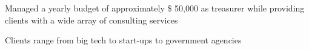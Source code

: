 \documentclass[letterpaper, article]{deedy-resume-openfont}
\begin{document}
\begin{minipage}[t]{0.66\textwidth}

\begin{tightemize}
	\item Managed a yearly budget of approximately \$ 50,000 as treasurer while providing clients with a wide array of consulting services
	\item Clients range from big tech to start-ups to government agencies
\end{tightemize}
\sectionsep




\end{minipage}
\end{document}
